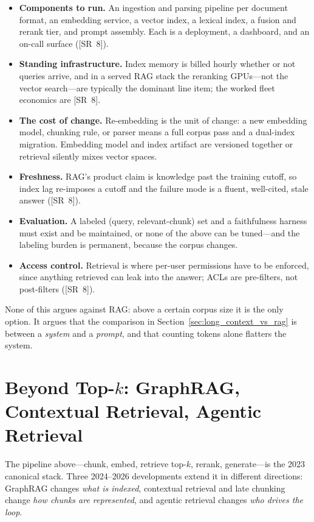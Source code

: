 \begin{itemize}
    \item \textbf{Components to run.} An ingestion and parsing pipeline per document format, an embedding service, a vector index, a lexical index, a fusion and rerank tier, and prompt assembly. Each is a deployment, a dashboard, and an on-call surface ([SR~8]).
    \item \textbf{Standing infrastructure.} Index memory is billed hourly whether or not queries arrive, and in a served RAG stack the reranking GPUs---not the vector search---are typically the dominant line item; the worked fleet economics are [SR~8].
    \item \textbf{The cost of change.} Re-embedding is the unit of change: a new embedding model, chunking rule, or parser means a full corpus pass and a dual-index migration. Embedding model and index artifact are versioned together or retrieval silently mixes vector spaces.
    \item \textbf{Freshness.} RAG's product claim is knowledge past the training cutoff, so index lag re-imposes a cutoff and the failure mode is a fluent, well-cited, stale answer ([SR~8]).
    \item \textbf{Evaluation.} A labeled (query, relevant-chunk) set and a faithfulness harness must exist and be maintained, or none of the above can be tuned---and the labeling burden is permanent, because the corpus changes.
    \item \textbf{Access control.} Retrieval is where per-user permissions have to be enforced, since anything retrieved can leak into the answer; ACLs are pre-filters, not post-filters ([SR~8]).
\end{itemize}

None of this argues against RAG: above a certain corpus size it is the only option. It argues that the comparison in Section~\ref{sec:long_context_vs_rag} is between a \emph{system} and a \emph{prompt}, and that counting tokens alone flatters the system.

\section{Beyond Top-$k$: GraphRAG, Contextual Retrieval, Agentic Retrieval}
\label{sec:modern_rag}

The pipeline above---chunk, embed, retrieve top-$k$, rerank, generate---is the 2023 canonical stack. Three 2024--2026 developments extend it in different directions: GraphRAG changes \textit{what is indexed}, contextual retrieval and late chunking change \textit{how chunks are represented}, and agentic retrieval changes \textit{who drives the loop}.


